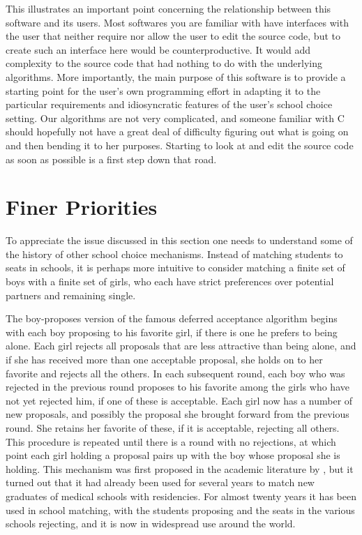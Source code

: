 \documentclass[12pt]{article}
\theoremstyle{definition}
\begin{document}
This illustrates an important point concerning the relationship
between this software and its users.  Most softwares you are familiar
with have interfaces with the user that neither require nor allow the
user to edit the source code, but to create such an interface here
would be counterproductive. It would add complexity to the source code
that had nothing to do with the underlying algorithms.  More
importantly, the main purpose of this software is to provide a
starting point for the user's own programming effort in adapting it to
the particular requirements and idiosyncratic features of the user's
school choice setting.  Our algorithms are not very complicated, and
someone familiar with C should hopefully not have a great deal of
difficulty figuring out what is going on and then bending it to her
purposes.  Starting to look at and edit the source code as soon as
possible is a first step down that road.


\section{Finer Priorities} \label{sec:Priorities}

To appreciate the issue discussed in this section one needs to
understand some of the history of other school choice mechanisms.
Instead of matching students to seats in schools, it is perhaps more
intuitive to consider matching a finite set of boys with a finite set
of girls, who each have strict preferences over potential partners and
remaining single.

The boy-proposes version of the famous deferred acceptance algorithm
begins with each boy proposing to his favorite girl, if there is one
he prefers to being alone.  Each girl rejects all proposals that are
less attractive than being alone, and if she has received more than
one acceptable proposal, she holds on to her favorite and rejects all
the others.  In each subsequent round, each boy who was rejected in
the previous round proposes to his favorite among the girls who have
not yet rejected him, if one of these is acceptable. Each girl now has
a number of new proposals, and possibly the proposal she brought
forward from the previous round.  She retains her favorite of these,
if it is acceptable, rejecting all others.  This procedure is repeated
until there is a round with no rejections, at which point each girl
holding a proposal pairs up with the boy whose proposal she is
holding. This mechanism was first proposed in the academic literature
by \cite{GaSh62}, but it turned out that it had already been used for
several years to match new graduates of medical schools with
residencies.  For almost twenty years it has been used in school
matching, with the students proposing and the seats in the various
schools rejecting, and it is now in widespread use around the world.
\end{document}
